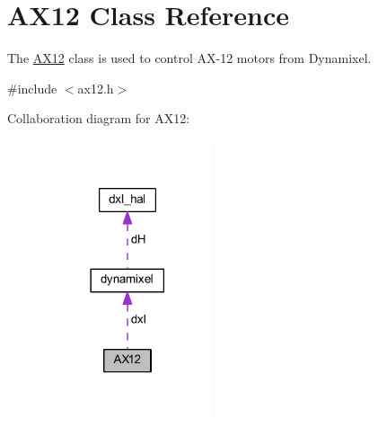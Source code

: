 \hypertarget{class_a_x12}{}\section{A\+X12 Class Reference}
\label{class_a_x12}


The \hyperlink{class_a_x12}{A\+X12} class is used to control A\+X-\/12 motors from Dynamixel.  




{\ttfamily \#include $<$ax12.\+h$>$}



Collaboration diagram for A\+X12\+:
\nopagebreak
\begin{figure}[H]
\begin{center}
\leavevmode
\includegraphics[width=141pt]{d4/dc1/class_a_x12__coll__graph}
\end{center}
\end{figure}
